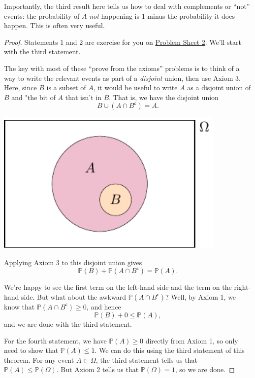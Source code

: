 \documentclass[
  a4paper,
]{book}
\theoremstyle{definition}
\theoremstyle{definition}
\theoremstyle{definition}
\theoremstyle{definition}
\theoremstyle{remark}
\begin{document}
Importantly, the third result here tells us how to deal with complements or ``not'' events: the probability of \(A\) \emph{not} happening is 1 minus the probability it does happen. This is often very useful.

\begin{proof}
Statements 1 and 2 are exercise for you on \protect\hyperlink{P2}{Problem Sheet 2}. We'll start with the third statement.

The key with most of these ``prove from the axioms'' problems is to think of a way to write the relevant events as part of a \emph{disjoint} union, then use Axiom 3. Here, since \(B\) is a subset of \(A\), it would be useful to write \(A\) as a disjoint union of \(B\) and "the bit of \(A\) that isn't in \(B\). That is, we have the disjoint union
\[ B \cup (A \cap B^\mathsf{c}) = A .\]

\begin{center}\includegraphics[width=320pt]{math1710_files/figure-latex/subs-1} \end{center}

Applying Axiom 3 to this disjoint union gives
\[ \mathbb P(B) + \mathbb P(A \cap B^\mathsf{c}) = \mathbb P(A) . \]

We're happy to see the first term on the left-hand side and the term on the right-hand side. But what about the awkward \(\mathbb P(A \cap B^\mathsf{c})\)? Well, by Axiom 1, we know that \(\mathbb P(A \cap B^\mathsf{c}) \geq 0\), and hence
\[ \mathbb P(B) + 0 \leq \mathbb P(A) , \]
and we are done with the third statement.

For the fourth statement, we have \(\mathbb P(A) \geq 0\) directly from Axiom 1, so only need to show that \(\mathbb P(A) \leq 1\). We can do this using the third statement of this theorem. For any event \(A \subset \Omega\), the third statement tells us that \(\mathbb P(A) \leq \mathbb P(\Omega)\). But Axiom 2 tells us that \(\mathbb P(\Omega) = 1\), so we are done.
\end{proof}
\end{document}
